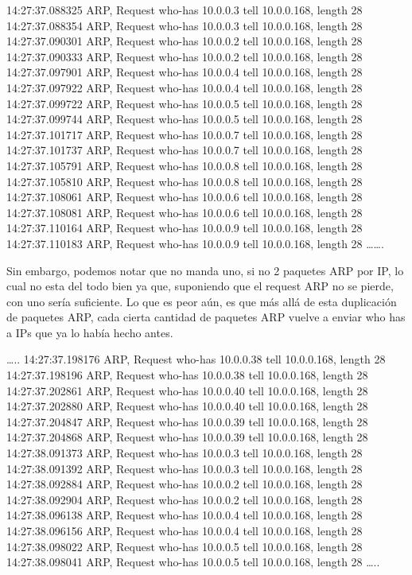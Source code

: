 14:27:37.088325 ARP, Request who-has 10.0.0.3 tell 10.0.0.168, length 28
14:27:37.088354 ARP, Request who-has 10.0.0.3 tell 10.0.0.168, length 28
14:27:37.090301 ARP, Request who-has 10.0.0.2 tell 10.0.0.168, length 28
14:27:37.090333 ARP, Request who-has 10.0.0.2 tell 10.0.0.168, length 28
14:27:37.097901 ARP, Request who-has 10.0.0.4 tell 10.0.0.168, length 28
14:27:37.097922 ARP, Request who-has 10.0.0.4 tell 10.0.0.168, length 28
14:27:37.099722 ARP, Request who-has 10.0.0.5 tell 10.0.0.168, length 28
14:27:37.099744 ARP, Request who-has 10.0.0.5 tell 10.0.0.168, length 28
14:27:37.101717 ARP, Request who-has 10.0.0.7 tell 10.0.0.168, length 28
14:27:37.101737 ARP, Request who-has 10.0.0.7 tell 10.0.0.168, length 28
14:27:37.105791 ARP, Request who-has 10.0.0.8 tell 10.0.0.168, length 28
14:27:37.105810 ARP, Request who-has 10.0.0.8 tell 10.0.0.168, length 28
14:27:37.108061 ARP, Request who-has 10.0.0.6 tell 10.0.0.168, length 28
14:27:37.108081 ARP, Request who-has 10.0.0.6 tell 10.0.0.168, length 28
14:27:37.110164 ARP, Request who-has 10.0.0.9 tell 10.0.0.168, length 28
14:27:37.110183 ARP, Request who-has 10.0.0.9 tell 10.0.0.168, length 28
…….

Sin embargo, podemos notar que no manda uno, si no 2 paquetes ARP por IP, lo cual no esta del todo bien ya que, suponiendo que el request ARP no se pierde, con uno sería suficiente. Lo que es peor aún, es que más allá de esta duplicación de paquetes ARP, cada cierta cantidad de paquetes ARP vuelve a enviar who has a IPs que ya lo había hecho antes.

…..
14:27:37.198176 ARP, Request who-has 10.0.0.38 tell 10.0.0.168, length 28
14:27:37.198196 ARP, Request who-has 10.0.0.38 tell 10.0.0.168, length 28
14:27:37.202861 ARP, Request who-has 10.0.0.40 tell 10.0.0.168, length 28
14:27:37.202880 ARP, Request who-has 10.0.0.40 tell 10.0.0.168, length 28
14:27:37.204847 ARP, Request who-has 10.0.0.39 tell 10.0.0.168, length 28
14:27:37.204868 ARP, Request who-has 10.0.0.39 tell 10.0.0.168, length 28
14:27:38.091373 ARP, Request who-has 10.0.0.3 tell 10.0.0.168, length 28
14:27:38.091392 ARP, Request who-has 10.0.0.3 tell 10.0.0.168, length 28
14:27:38.092884 ARP, Request who-has 10.0.0.2 tell 10.0.0.168, length 28
14:27:38.092904 ARP, Request who-has 10.0.0.2 tell 10.0.0.168, length 28
14:27:38.096138 ARP, Request who-has 10.0.0.4 tell 10.0.0.168, length 28
14:27:38.096156 ARP, Request who-has 10.0.0.4 tell 10.0.0.168, length 28
14:27:38.098022 ARP, Request who-has 10.0.0.5 tell 10.0.0.168, length 28
14:27:38.098041 ARP, Request who-has 10.0.0.5 tell 10.0.0.168, length 28
…..
 
